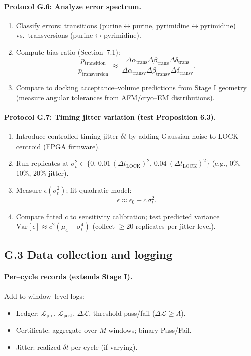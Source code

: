 \documentclass[11pt]{article}
\begin{document}
\paragraph{Protocol G.6: Analyze error spectrum.}
\begin{enumerate}
\item Classify errors: transitions (purine$\leftrightarrow$purine, pyrimidine$\leftrightarrow$pyrimidine) vs.\ transversions (purine$\leftrightarrow$pyrimidine).
\item Compute bias ratio (Section~7.1):
\[
\frac{p_{\mathrm{transition}}}{p_{\mathrm{transversion}}}\ \approx\ \frac{\Delta\alpha_{\mathrm{trans}}\Delta\beta_{\mathrm{trans}}\Delta\delta_{\mathrm{trans}}}{\Delta\alpha_{\mathrm{transv}}\Delta\beta_{\mathrm{transv}}\Delta\delta_{\mathrm{transv}}}.
\]
\item Compare to docking acceptance–volume predictions from Stage I geometry (measure angular tolerances from AFM/cryo–EM distributions).
\end{enumerate}

\paragraph{Protocol G.7: Timing jitter variation (test Proposition 6.3).}
\begin{enumerate}
\item Introduce controlled timing jitter $\delta t$ by adding Gaussian noise to \textsf{LOCK} centroid (FPGA firmware).
\item Run replicates at $\sigma_t^2\in\{0,\,0.01\,(\Delta t_{\mathrm{LOCK}})^2,\,0.04\,(\Delta t_{\mathrm{LOCK}})^2\}$ (e.g., 0\%, 10\%, 20\% jitter).
\item Measure $\epsilon(\sigma_t^2)$; fit quadratic model:
\[
\epsilon\approx \epsilon_0+c\,\sigma_t^2.
\]
\item Compare fitted $c$ to sensitivity calibration; test predicted variance $\mathrm{Var}[\epsilon]\approx c^2(\mu_4-\sigma_t^4)$ (collect $\ge 20$ replicates per jitter level).
\end{enumerate}

\subsection*{G.3 Data collection and logging}

\paragraph{Per–cycle records (extends Stage I).}
Add to window–level logs:
\begin{itemize}
\item Ledger: $\mathcal{L}_{\mathrm{pre}}$, $\mathcal{L}_{\mathrm{post}}$, $\Delta\mathcal{L}$, threshold pass/fail ($\Delta\mathcal{L}\ge\Lambda$).
\item Certificate: aggregate over $M$ windows; binary \textsf{Pass/Fail}.
\item Jitter: realized $\delta t$ per cycle (if varying).
\end{itemize}
\end{document}
